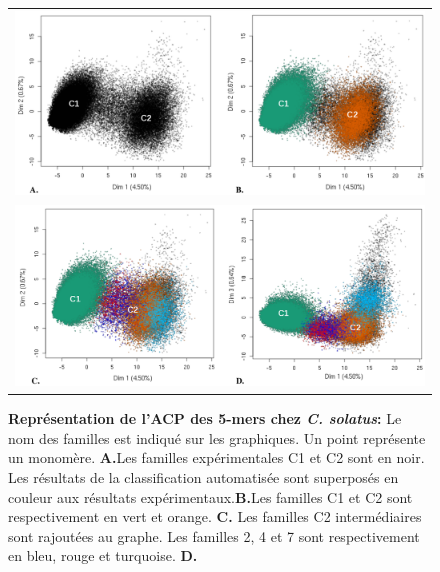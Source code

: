 \documentclass[12pt,a4paper]{article}
\begin{document}
	\begin{figure}	
		\begin{tabular}{c} 
			\includegraphics[scale=0.4]{img/ACP_solatus_1.png}  \\
			\includegraphics[scale=0.4]{img/ACP_solatus_2.png}  \\
		\end{tabular}
\caption{\textbf{Représentation de l'ACP des 5-mers chez \textit{C. solatus}:}
\label{fig:ACP_solatus}
Le nom des familles est indiqué sur les graphiques. Un point représente un monomère. \textbf{A.}Les familles expérimentales C1 et C2 sont en noir. Les résultats de la classification automatisée sont superposés en couleur aux résultats expérimentaux.\textbf{B.}Les familles C1 et C2 sont respectivement en vert et orange. \textbf{C.} Les familles C2 intermédiaires sont rajoutées au graphe. Les familles 2, 4 et 7 sont respectivement en  bleu, rouge et turquoise. \textbf{D.}} 
\end{figure}
\end{document}
